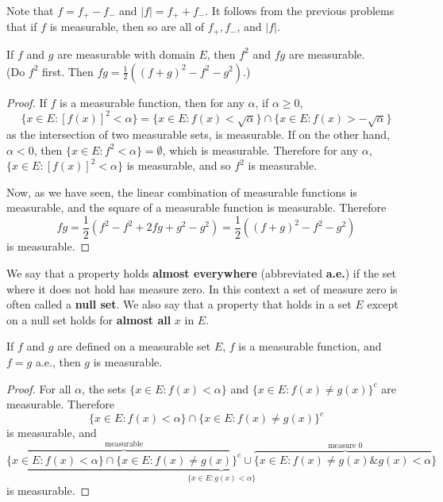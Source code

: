 \begin{rmk}%
	Note that $f = f_+ - f_-$ and $|f| = f_+ + f_-$. It follows from the 
	previous problems that if $f$ is measurable, then so are all of $f_+, f_-$, 
	and $|f|$. 
\end{rmk}

\begin{pblm}%
	If $f$ and $g$ are measurable with domain $E$, then $f^2$ and $fg$ are 
	measurable. \\ (Do $f^2$ first. Then 
	$fg = \frac{1}{2}\left( (f + g)^2 - f^2 - g^2\right)$.)
\begin{proof}
	If $f$ is a measurable function, then for any $\alpha$, if $\alpha \ge 0$, 
	\begin{equation*}
		\{x \in E: [f(x)]^2 < \alpha\} = \{x \in E: f(x) < \sqrt{\alpha}\} \cap \{x \in E: f(x) > -\sqrt{\alpha}\}
	\end{equation*}
	as the intersection of two measurable sets, is measurable. 
	If on the other hand, $\alpha < 0$, then $\{x \in E: f^2 < \alpha\} = \emptyset$, which is measurable. 
	Therefore for any $\alpha$, $\{x \in E: [f(x)]^2 < \alpha\}$ is measurable, and so $f^2$ is measurable. 

	Now, as we have seen, the linear combination of measurable functions is measurable, and the 
	square of a measurable function is measurable. Therefore 
	\begin{equation*}
		fg = \frac{1}{2}\left(f^2 - f^2 + 2fg + g^2 - g^2\right) = 
		\frac{1}{2}\left((f+g)^2 - f^2 - g^2\right)
	\end{equation*}
	is measurable. 
\end{proof}
\end{pblm}

\begin{defn}\label{d:ae}%
	We say that a property holds \textbf{almost everywhere} (abbreviated 
	\textbf{a.e.}) if the set where it does not hold has measure zero. In this 
	context a set of measure zero is often called a \textbf{null set}. We also 
	say that a property that holds in a set $E$ except on a null set holds for 
	\textbf{almost all} $x$ in $E$. 
\end{defn}

\begin{pblm}%
	If $f$ and $g$ are defined on a measurable set $E$, $f$ is a measurable 
	function, and $f = g$ a.e., then $g$ is measurable. 
\begin{proof}
	For all $\alpha$, the sets $\{x \in E: f(x) < \alpha\}$ and 
	$\{x \in E: f(x) \neq g(x)\}^c$ are measurable. Therefore 
	\begin{equation*}
		\{x \in E: f(x) < \alpha\} \cap \{x \in E: f(x) \neq g(x)\}^c
	\end{equation*}
	is measurable, and 
	\begin{equation*}
		\underbrace{ 
			\overbrace{\{x \in E: f(x) < \alpha\}\cap\{x \in E: f(x) \neq g(x)\}^c}^{\text{measurable}} 
			\cup \overbrace{\{x \in E: f(x) \neq g(x) \& g(x) < \alpha \}}^{\text{measure }0}
		}_{\{x \in E: g(x) < \alpha\}}
	\end{equation*}
	is measurable. 
\end{proof}
\end{pblm}

